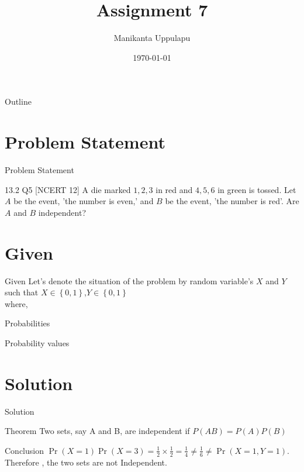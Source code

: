 \documentclass{beamer}
\title{Assignment 7}
\author{Manikanta Uppulapu}
\date{\today}
\providecommand{\cbrak}[1]{\ensuremath{\left\{#1\right\}}}
\providecommand{\cbrak}[1]{\ensuremath{\left\{#1\right\}}}
\begin{document}
\begin{frame}
    \titlepage 
\end{frame}

\logo{}


\begin{frame}{Outline}
    \tableofcontents
\end{frame}



\section{Problem Statement}
\begin{frame}{Problem Statement}
    \begin{block}{13.2 Q5 [NCERT 12] }A die marked $1, 2, 3$ in red and $4, 5, 6$ in green is tossed. Let $A$ be the event, 'the number is even,' and $B$ be the event, 'the number is red'. Are $A$ and $B$ independent?
    \end{block}
\end{frame}



\section{Given}
\begin{frame}{Given}
Let's denote the situation of the problem by random variable's $X$ and $Y$  such that $X\in \cbrak{0,1}$,$Y\in \cbrak{0,1}$\\
where,\\
\begin{table}[ht!]
    \centering
    
    \caption{}
\label{table:table1}
\end{table}

  
\end{frame}

\begin{frame}{Probabilities}
\begin{table}[ht!]
    \centering
    
    \caption{Probability values}
\label{table:table1}
\end{table}

\end{frame}

\section{Solution}
\begin{frame}{Solution}
\begin{exampleblock}{Theorem}
        Two sets, say A and B, are independent if $P(AB) = P(A)P(B)$
   \end{exampleblock}
   \begin{block}{Conclusion}
        $\Pr(X=1)\Pr(X=3) = \frac{1}{2} \times \frac{1}{2} =   \frac{1}{4} \neq \frac{1}{6} \neq \Pr(X=1,Y=1)$.\\
        Therefore , the two sets are not Independent.
    \end{block}

\end{frame}
\end{document}
